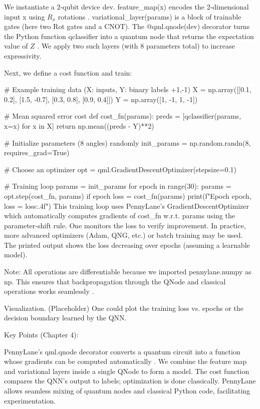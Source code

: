 We instantiate a 2-qubit device dev.
feature_map(x) encodes the 2-dimensional input x using $R_x$ rotations .
variational_layer(params) is a block of trainable gates (here two Rot gates and a CNOT).
The @qml.qnode(dev) decorator turns the Python function qclassifier into a quantum node that returns the expectation value of $Z$ .
We apply two such layers (with 8 parameters total) to increase expressivity.




Next, we define a cost function and train:

# Example training data (X: inputs, Y: binary labels {+1,-1})
X = np.array([[0.1, 0.2], [1.5, -0.7], [0.3, 0.8], [0.9, 0.4]])
Y = np.array([1, -1, 1, -1])

# Mean squared error cost
def cost_fn(params):
    preds = [qclassifier(params, x=x) for x in X]
    return np.mean((preds - Y)**2)

# Initialize parameters (8 angles) randomly
init_params = np.random.randn(8, requires_grad=True)

# Choose an optimizer
opt = qml.GradientDescentOptimizer(stepsize=0.1)

# Training loop
params = init_params
for epoch in range(30):
    params = opt.step(cost_fn, params)
    if epoch %
        loss = cost_fn(params)
        print(f"Epoch {epoch}, loss = {loss:.4f}")
This training loop uses PennyLane’s GradientDescentOptimizer which automatically computes gradients of cost_fn w.r.t. params using the parameter-shift rule.  One monitors the loss to verify improvement.  In practice, more advanced optimizers (Adam, QNG, etc.) or batch training may be used.  The printed output shows the loss decreasing over epochs (assuming a learnable model).



Note: All operations are differentiable because we imported pennylane.numpy as np.  This ensures that backpropagation through the QNode and classical operations works seamlessly .



Visualization. (Placeholder) One could plot the training loss vs. epochs or the decision boundary learned by the QNN.



Key Points (Chapter 4):



PennyLane’s qml.qnode decorator converts a quantum circuit into a function whose gradients can be computed automatically .
We combine the feature map and variational layers inside a single QNode to form a model.
The cost function compares the QNN’s output to labels; optimization is done classically.
PennyLane allows seamless mixing of quantum nodes and classical Python code, facilitating experimentation.





